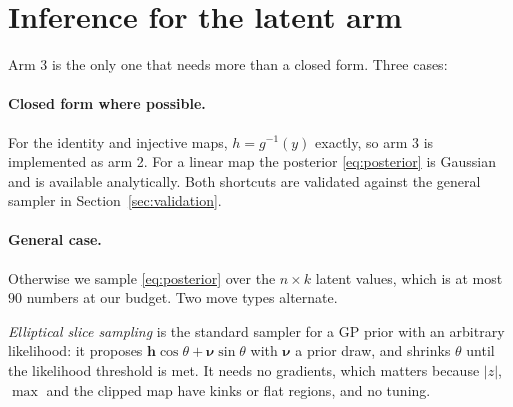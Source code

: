 \documentclass[11pt]{article}
\begin{document}
\section{Inference for the latent arm}

Arm 3 is the only one that needs more than a closed form. Three cases:

\paragraph{Closed form where possible.} For the identity and injective maps,
$h=g^{-1}(y)$ exactly, so arm 3 is implemented as arm 2. For a linear map the
posterior \eqref{eq:posterior} is Gaussian and is available analytically. Both
shortcuts are validated against the general sampler in Section~\ref{sec:validation}.

\paragraph{General case.} Otherwise we sample \eqref{eq:posterior} over the
$n\times k$ latent values, which is at most $90$ numbers at our budget. Two move
types alternate.

\emph{Elliptical slice sampling} \cite{murray2010} is the standard sampler for a
GP prior with an arbitrary likelihood: it proposes
$\mathbf{h}\cos\theta+\boldsymbol{\nu}\sin\theta$ with
$\boldsymbol{\nu}$ a prior draw, and shrinks $\theta$ until the likelihood
threshold is met. It needs no gradients, which matters because $|z|$, $\max$ and
the clipped map have kinks or flat regions, and no tuning.
\end{document}
